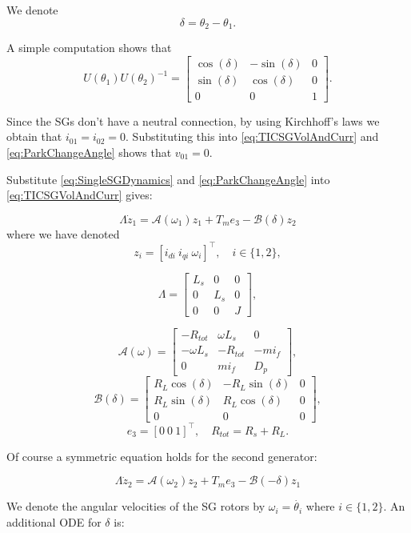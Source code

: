 \documentclass[letterpaper, 10 pt, conference]{ieeeconf}  %
\newcommand{\BE}{\begin{equation}}
\newcommand{\BEQ}[1]{\BE\label{#1}} %
\begin{document}
We denote $$\delta=\theta_{2}-\theta_{1}.$$

A simple computation shows that 
\BEQ{eq:ParkChangeAngle}
  U(\theta_{1})U(\theta_{2})^{-1}=\left[\begin{array}{ccc}
\cos(\delta) & -\sin(\delta) & 0\\
\sin(\delta) & \cos(\delta) & 0\\
0 & 0 & 1
\end{array}\right].
\end{equation}

Since the SGs don't have a neutral connection,  by using Kirchhoff's laws we obtain that $i_{01}=i_{02}=0$.  Substituting this into \eqref{eq:TICSGVolAndCurr} and \eqref{eq:ParkChangeAngle} shows that $v_{01} = 0$.

Substitute \eqref{eq:SingleSGDynamics} and \eqref{eq:ParkChangeAngle} into \eqref{eq:TICSGVolAndCurr}  gives:

\[
\varLambda\dot{z}_{1}=\mathcal{A}(\omega_{1})z_{1}+T_{m}e_{3}-\mathcal{B}(\delta)z_{2}
\]
where we have denoted
 $$z_{i}=\left[i_{di}\ i_{qi}\  \omega_{i}\right]^\top,\quad i\in\{1,2\},$$

\[
\varLambda=\left[\begin{array}{ccc}
L_{s} & 0 & 0\\
0 & L_{s} & 0\\
0 & 0 & J
\end{array}\right],
\]

\[
\mathcal{A}(\omega)=\left[\begin{array}{ccc}
-R_{tot} & \omega L_{s} & 0\\
-\omega L_{s} & -R_{tot} & -mi_{f}\\
0 & mi_{f} & D_{p}
\end{array}\right],
\]
\[\mathcal{B}(\delta)=\left[\begin{array}{ccc}
R_{L}\cos(\delta) & -R_{L}\sin(\delta) & 0\\
R_{L}\sin(\delta) & R_{L}\cos(\delta) & 0\\
0 & 0 & 0
\end{array}\right],
\]
$$e_{3}=\left[0\ 0\ 1\right]^\top, \quad  R_{tot}=R_{s}+R_{L}.$$

Of course a symmetric equation holds for the second generator:

\[
\varLambda\dot{z}_{2}=\mathcal{A}(\omega_{2})z_{2}+T_{m}e_{3}-\mathcal{B}(-\delta)z_{1}
\]

We denote the angular velocities  of the SG rotors by $\omega_i = \dot{\theta_i}$ where $i \in \{1,2\}$. 
An additional ODE for $\delta$ is:
\end{document}
